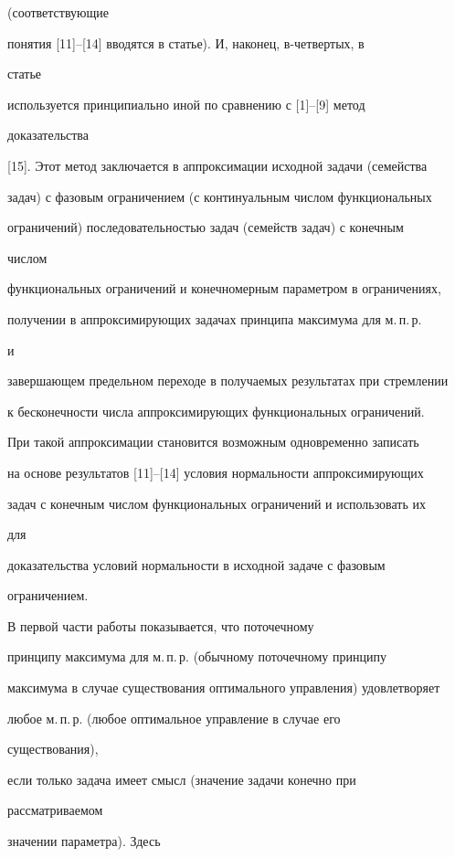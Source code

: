 (соответствующие 


понятия [11]--[14] вводятся в статье). И, наконец, в-четвертых, в 


статье 


используется принципиально иной по сравнению с [1]--[9] метод 


доказательства 


[15]. Этот метод заключается в аппроксимации исходной задачи (семейства 


задач) с фазовым ограничением (с континуальным числом функциональных 


ограничений) последовательностью задач (семейств задач) с конечным 


числом 


функциональных ограничений и конечномерным параметром в ограничениях, 


получении в аппроксимирующих задачах принципа максимума для м.\,п.\,р. 


и 


завершающем предельном переходе в получаемых результатах при стремлении 


к бесконечности числа аппроксимирующих функциональных ограничений. 


При такой аппроксимации становится возможным одновременно записать 


на основе результатов [11]--[14] условия нормальности аппроксимирующих 


задач с конечным числом функциональных ограничений и использовать их 


для 


доказательства условий нормальности в исходной задаче с фазовым 


ограничением. 


 


В первой части работы показывается, что поточечному 


принципу максимума для м.\,п.\,р. (обычному поточечному принципу 


максимума в случае существования оптимального управления) удовлетворяет 


любое м.\,п.\,р. (любое оптимальное управление в случае его 


существования), 


если только задача имеет смысл (значение задачи конечно при 


рассматриваемом 


значении параметра). Здесь 


